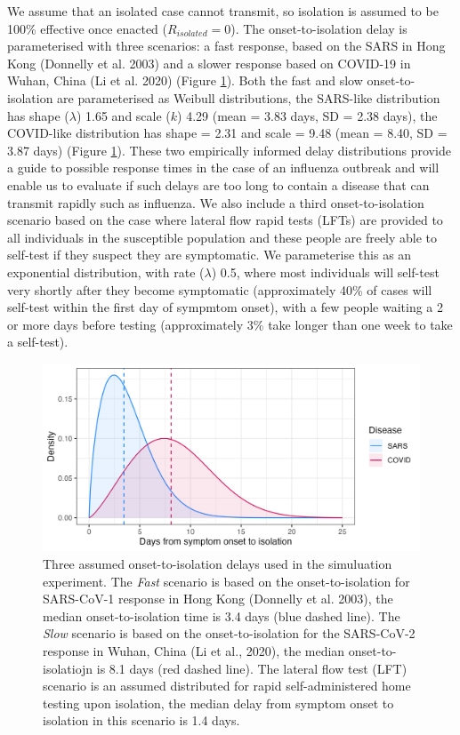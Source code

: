 \documentclass{article}
\begin{document}
We assume that an isolated case cannot transmit, so isolation is assumed to be 100\% effective once enacted ($R_{isolated} = 0$). The onset-to-isolation delay is parameterised with three scenarios: a fast response, based on the SARS in Hong Kong (Donnelly et al. 2003) and a slower response based on COVID-19 in Wuhan, China (Li et al. 2020) (Figure \ref{fig:onset-to-isolation}). Both the fast and slow onset-to-isolation are parameterised as Weibull distributions, the SARS-like distribution has shape ($\lambda$) 1.65 and scale ($k$) 4.29 (mean = 3.83 days, SD = 2.38 days), the COVID-like distribution has shape = 2.31 and scale = 9.48 (mean = 8.40, SD = 3.87 days) (Figure \ref{fig:onset-to-isolation}). These two empirically informed delay distributions provide a guide to possible response times in the case of an influenza outbreak and will enable us to evaluate if such delays are too long to contain a disease that can transmit rapidly such as influenza. We also include a third onset-to-isolation scenario based on the case where lateral flow rapid tests (LFTs) are provided to all individuals in the susceptible population and these people are freely able to self-test if they suspect they are symptomatic. We parameterise this as an exponential distribution, with rate ($\lambda$) 0.5, where most individuals will self-test very shortly after they become symptomatic (approximately 40\% of cases will self-test within the first day of sympmtom onset), with a few people waiting a 2 or more days before testing (approximately 3\% take longer than one week to take a self-test). \\

\begin{figure}[ht]
\centering
\includegraphics[width=\textwidth]{../plots/onset_to_isolation.png}
\caption{Three assumed onset-to-isolation delays used in the simuluation experiment. The \textit{Fast} scenario is based on the onset-to-isolation for SARS-CoV-1 response in Hong Kong (Donnelly et al. 2003), the median onset-to-isolation time is 3.4 days (blue dashed line). The \textit{Slow} scenario is based on the onset-to-isolation for the SARS-CoV-2 response in Wuhan, China (Li et al., 2020), the median onset-to-isolatiojn is 8.1 days (red dashed line). The lateral flow test (LFT) scenario is an assumed distributed for rapid self-administered home testing upon isolation, the median delay from symptom onset to isolation in this scenario is 1.4 days.}
\label{fig:onset-to-isolation}
\end{figure}
\end{document}
